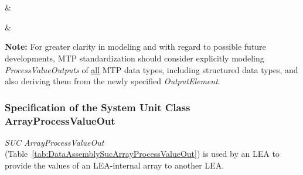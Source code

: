\begin{footnotesize}
\begin{longtable}
		\\ \hline
	
		\\ \hline
	
		     & 
		\\ \hline
	
		     & 
		\\ \hline
	
	\end{longtable}
\end{footnotesize}

\textbf{Note:} For greater clarity in modeling and with regard to possible future developments, MTP standardization should consider explicitly modeling \emph{ProcessValueOutputs} of \underline{all} MTP data types, including structured data types, and also deriving them from the newly specified \emph{OutputElement}.

\subsubsection{Specification of the System Unit Class ArrayProcessValueOut}

\emph{SUC ArrayProcessValueOut} (Table~\ref{tab:DataAssemblySucArrayProcessValueOut}) is used by an LEA to provide the values of an LEA-internal array to another LEA.

